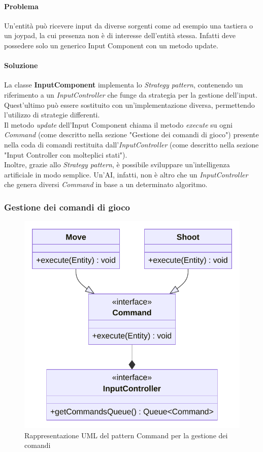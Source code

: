 \documentclass[a4paper,12pt]{report}
\begin{document}
\paragraph{Problema} Un’entità può ricevere input da diverse sorgenti come ad esempio una tastiera o un joypad, 
la cui presenza non è di interesse dell’entità stessa. 
Infatti deve possedere solo un generico Input Component con un metodo update.

\paragraph{Soluzione} La classe \textbf{InputComponent} implementa lo \textit{Strategy pattern}, contenendo un riferimento a un \textit{InputController} che funge da strategia per la gestione dell'input. Quest'ultimo può essere sostituito con un'implementazione diversa, permettendo l'utilizzo di strategie differenti.
\\
Il metodo \textit{update} dell’Input Component chiama il metodo \textit{execute} su ogni \textit{Command} (come descritto nella sezione "Gestione dei comandi di gioco") presente nella coda di comandi restituita dall'\textit{InputController} (come descritto nella sezione "Input Controller con molteplici stati").
\\
Inoltre, grazie allo \textit{Strategy pattern}, è possibile sviluppare un'intelligenza artificiale in modo semplice. Un'AI, infatti, non è altro che un \textit{InputController} che genera diversi \textit{Command} in base a un determinato algoritmo.
\\

\subsubsection{Gestione dei comandi di gioco}

\begin{figure}[H]
\centering{}
\includegraphics[scale=0.75]{img/CommandsUML}
\caption{Rappresentazione UML del pattern Command per la gestione dei comandi}
\label{img:command}
\end{figure}
\end{document}
